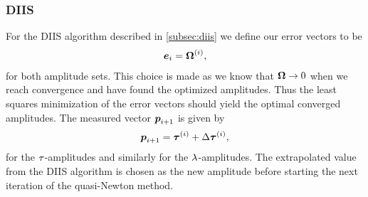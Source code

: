             \subsubsection{DIIS}
                For the DIIS algorithm described in \autoref{subsec:diis} we
                define our error vectors to be
                \begin{align}
                    \boldsymbol{e}_{i} = \boldsymbol{\Omega}^{(i)},
                \end{align}
                for both amplitude sets.
                This choice is made as we know that $\boldsymbol{\Omega} \to 0$ when we
                reach convergence and have found the optimized amplitudes.
                Thus the least squares minimization of the error vectors should
                yield the optimal converged amplitudes.
                The measured vector $\boldsymbol{p}_{i + 1}$ is given by
                \begin{align}
                    \boldsymbol{p}_{i + 1}
                    = \boldsymbol{\tau}^{(i)}
                    + \Delta\boldsymbol{\tau}^{(i)},
                \end{align}
                for the $\tau$-amplitudes and similarly for the
                $\lambda$-amplitudes.
                The extrapolated value from the DIIS algorithm is chosen as the new
                amplitude before starting the next iteration of the quasi-Newton
                method.


